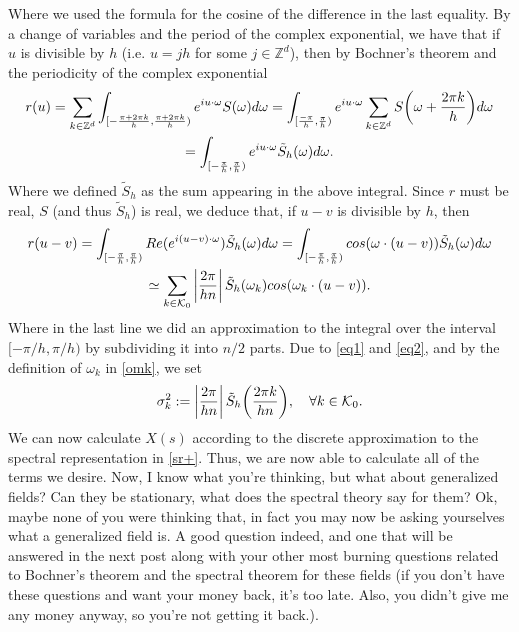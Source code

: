 \documentclass[
    a4paper,
    DIV=14,
    abstract=true,
    numbers=noenddot
]{scrartcl}
\begin{document}
Where we used the formula for the cosine of the difference in the last equality.
By a change of variables and the period of the complex exponential, we have that if $u$ is divisible by  $h$ (i.e. $u=jh$ for some $j\in\mathbb{Z}^d$), then by Bochner's theorem and the periodicity of the complex exponential
\begin{multline*}
	r(u)=\sum_{k\in \mathbb{Z}^d} \int_{[-\frac{\pi+2\pi k}{h},\frac{\pi+2\pi k}{h})} e^{iu\cdot\omega}S(\omega)d\omega= \int_{[\frac{-\pi}{h},\frac{\pi}{h})} e^{iu\cdot\omega}\sum_{k\in \mathbb{Z}^d} S\qty(\omega+ \frac{ 2\pi k}{h})d\omega\\=\int_{[-\frac{\pi}{h},\frac{\pi}{h})} e^{iu\cdot\omega}\tilde{S}_h(\omega)d\omega.
\end{multline*}
Where we defined $\tilde{S}_h$ as the sum appearing in the above integral.
Since $r$ must be real, $S$ (and thus $\tilde{S}_h$) is real, we deduce that, if $u-v$ is divisible by  $h$, then
\begin{multline}\label{eq2}
	r(u-v)=\int_{[-\frac{\pi}{h},\frac{\pi}{h})} Re(e^{i(u-v)\cdot\omega})\tilde{S}_h(\omega)d\omega=\int_{[-\frac{\pi}{h},\frac{\pi}{h})}cos(\omega\cdot(u-v)) \tilde{S}_h(\omega)d\omega\\
	\simeq \sum_{k \in \mathcal{K}_0}\left| \frac{2\pi}{hn} \right|\tilde{S}_h(\omega_k)cos(\omega_k\cdot(u-v)).
\end{multline}
Where in the last line we did an approximation to the integral over the interval $[-\pi/h,\pi/h)$ by subdividing it into $n/2$ parts.
Due to \eqref{eq1} and \eqref{eq2}, and by the definition of $\omega_k$ in \eqref{omk},  we set
\begin{equation*}
	\sigma _k^2:= \left| \frac{2\pi}{hn} \right|\tilde{S}_h\qty(\frac{2\pi k}{hn}),\quad\forall k\in \mathcal{K}_0.
\end{equation*}
We can now calculate $X(s)$ according to the discrete approximation to the spectral representation in \eqref{sr+}. Thus, we are now able to calculate all of the terms we desire.
Now, I know what you're thinking, but what about generalized fields? Can they be stationary, what does the spectral theory say for them? Ok, maybe none of you were thinking that, in fact you may now be asking yourselves what a generalized field is. A good question indeed, and one that will be answered in the next post along with your other most burning questions related to Bochner's theorem and the spectral theorem for these fields (if you don't have these questions and want your money back, it's too late. Also, you didn't give me any money anyway, so you're not getting it back.).
\end{document}
